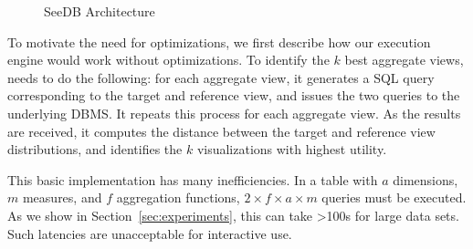 \begin{figure}[htb]
\vspace{-5pt}
\centerline{
\hbox{}}
\vspace{-12pt}
\caption{SeeDB Architecture}
\vspace{-10pt}
\label{fig:sys-arch}
\end{figure} 

To motivate the need for optimizations, we first describe 
how our execution engine would work without optimizations. 
To identify the $k$ best aggregate views,
\SeeDB needs to do the following:
for each aggregate view, it generates
a SQL query corresponding to the target
and reference view, and issues
the two queries to the underlying DBMS.
It repeats this process for each aggregate view.
As the results are received, it computes the
distance between the target and reference view
distributions, and identifies the $k$ visualizations
with highest utility. 

This basic implementation has many inefficiencies.
In a table with $a$ dimensions, $m$ measures, and $f$ aggregation functions, 
$2\times f \times a \times  m$ queries must be executed.  
As we show in Section~\ref{sec:experiments}, this can take >100s for
 large data sets.
Such latencies are unacceptable for interactive use.


